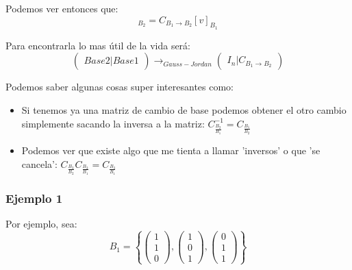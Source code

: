 \documentclass[12pt]{report}                                %
\begin{document}
        Podemos ver entonces que:
        \begin{equation*}
            [v]_{B_2} = C_{B_1 \to B_2} [v]_{B_1}
        \end{equation*}

        Para encontrarla lo mas útil de la vida será:
        \begin{equation}
            \begin{pmatrix}  Base 2  \vert Base 1 \end{pmatrix} \to_{Gauss-Jordan}
            \begin{pmatrix}  I_n  \vert C_{B_1 \to B_2} \end{pmatrix}
        \end{equation}


        Podemos saber algunas cosas super interesantes como:
        \begin{itemize}
            \item Si tenemos ya una matriz de cambio de base podemos obtener el otro cambio simplemente sacando la inversa a la matriz:
            $ C^{-1}_{\frac{B_2}{B_1}} = C_{\frac{B_1}{B_2}} $
            
            \item Podemos ver que existe algo que me tienta a llamar 'inversos' o que 'se cancela': 
            $ C_{\frac{B_3}{B_2}} C_{\frac{B_2}{B_1}} = C_{\frac{B_3}{B_1}} $

        \end{itemize}

        \subsubsection{Ejemplo 1}

        Por ejemplo, sea:
        \begin{equation*}
            B_1 = \left\{
                \begin{pmatrix} 1 \\ 1 \\0 \end{pmatrix}, \begin{pmatrix} 1 \\ 0 \\1 \end{pmatrix},
                \begin{pmatrix} 0 \\ 1 \\1 \end{pmatrix}
            \right\}
        \end{equation*}
\end{document}

